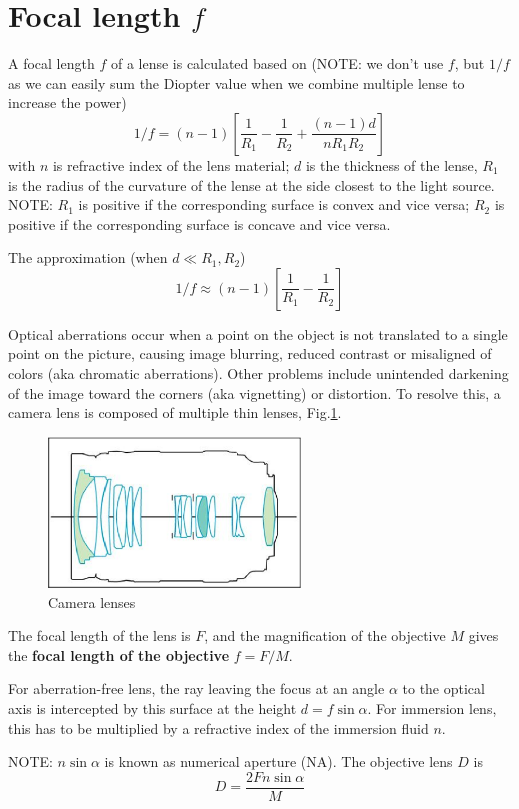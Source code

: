 \section{Focal length $f$}

A focal length $f$ of a lense is calculated based on (NOTE: we don't use $f$,
but $1/f$ as we can easily sum the Diopter value when we combine multiple lense
to increase the power)
\begin{equation}
1/f = (n-1)\left[ \frac{1}{R_1} - \frac{1}{R_2} +
\frac{(n-1)d}{nR_1R_2} \right] 
\end{equation}
with $n$ is refractive index of the lens material; $d$ is the thickness of the
lense, $R_1$ is the radius of the curvature of the lense at the side closest to
the light source. NOTE: $R_1$ is positive if the corresponding surface is convex
and vice versa; $R_2$ is positive if the corresponding surface is concave and
vice versa. 

The approximation (when $d \ll R_1, R_2$)
\begin{equation}
1/f \approx (n-1)\left[ \frac{1}{R_1} - \frac{1}{R_2} \right]
\end{equation}


Optical aberrations occur when a point on the object is not translated to a
single point on the picture, causing image blurring, reduced contrast or
misaligned of colors (aka chromatic aberrations). Other problems include
unintended darkening of the image toward the corners (aka vignetting) or
distortion. To resolve this, a camera lens is composed of multiple thin lenses,
Fig.\ref{fig:camera_lens}.

\begin{figure}[hbt]
  \centerline{\includegraphics[height=4cm,
    angle=0]{./images/camera_lens.eps}}    
\caption{Camera lenses}
\label{fig:camera_lens}
\end{figure}


\begin{framed}
  The focal length of the lens is $F$, and the magnification of the
  objective $M$ gives the {\bf focal length of the objective}
  $f=F/M$. 

  For aberration-free lens, the ray leaving the focus at an angle
  $\alpha$ to the optical axis is intercepted by this surface at the
  height $d=f\sin\alpha$. For immersion lens, this has to be
  multiplied by a refractive index of the immersion fluid $n$. 

  NOTE: $n\sin\alpha$ is known as numerical aperture (NA). The
  objective lens $D$ is
  \begin{equation}
    \label{eq:1112}
    D = \frac{2Fn\sin\alpha}{M}
  \end{equation}

\end{framed}



